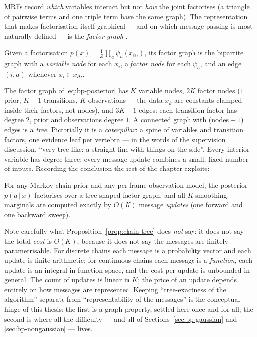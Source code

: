 MRFs record \emph{which} variables interact but not \emph{how} the joint
factorises (a triangle of pairwise terms and one triple term have the same
graph). The representation that makes factorisation itself graphical ---
and on which message passing is most naturally defined --- is the
\emph{factor graph} \citep{kschischang2001factor,
koller2009probabilistic}.

\begin{definition}
Given a factorisation $p(x) = \frac{1}{Z}\prod_{a} \psi_a(x_{\partial a})$,
its factor graph is the bipartite graph with a \emph{variable node} for
each $x_i$, a \emph{factor node} for each $\psi_a$, and an edge $(i, a)$
whenever $x_i \in x_{\partial a}$.
\end{definition}

The factor graph of \eqref{eq:bp-posterior} has $K$ variable nodes, $2K$
factor nodes ($1$ prior, $K{-}1$ transitions, $K$ observations --- the
data $x_k$ are constants clamped inside their factors, not nodes), and
$3K - 1$ edges: each transition factor has degree $2$, prior and
observations degree $1$. A connected graph with (nodes${}-1$) edges is a
\emph{tree}. Pictorially it is a \emph{caterpillar}: a spine of variables
and transition factors, one evidence leaf per vertebra --- in the words of
the supervision discussion, ``very tree-like: a straight line with things
on the side''. Every interior variable has degree three; every message
update combines a small, fixed number of inputs. Recording the conclusion
the rest of the chapter exploits:

\begin{proposition}\label{prop:chain-tree}
For any Markov-chain prior and any per-frame observation model, the
posterior $p(a \,|\, x)$ factorises over a tree-shaped factor graph, and
all $K$ smoothing marginals are computed exactly by $O(K)$ message
\emph{updates} (one forward and one backward sweep).
\end{proposition}

Note carefully what Proposition~\ref{prop:chain-tree} does \emph{not} say:
it does not say the total \emph{cost} is $O(K)$, because it does not say
the messages are finitely parametrisable. For discrete chains each message
is a probability vector and each update is finite arithmetic; for
continuous chains each message is a \emph{function}, each update is an
integral in function space, and the cost per update is unbounded in
general. The count of updates is linear in $K$; the price of an update
depends entirely on how messages are represented. Keeping
``tree-exactness of the algorithm'' separate from ``representability of
the messages'' is the conceptual hinge of this thesis: the first is a
graph property, settled here once and for all; the second is where all the
difficulty --- and all of Sections~\ref{sec:bp-gaussian} and
\ref{sec:bp-nongaussian} --- lives.

